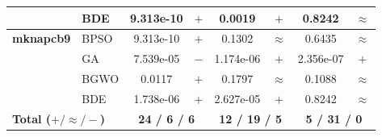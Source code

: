 \begin{table}[htbp]
\begin{tabular*}{\textwidth}{@{\extracolsep{\fill}}llcccccc@{}}
                       & BDE   & 9.313e-10 & $+$ &    0.0019 & $+$ &    0.8242 & $\approx$ \\
    \midrule
    \textbf{mknapcb9}  & BPSO  & 9.313e-10 & $+$ &    0.1302 & $\approx$ &    0.6435 & $\approx$ \\
                       & GA    & 7.539e-05 & $-$ & 1.174e-06 & $+$ & 2.356e-07 & $+$ \\
                       & BGWO  &    0.0117 & $+$ &    0.1797 & $\approx$ &    0.1088 & $\approx$ \\
                       & BDE   & 1.738e-06 & $+$ & 2.627e-05 & $+$ &    0.8242 & $\approx$ \\
    \midrule
    \multicolumn{2}{l}{\textbf{Total ($+ / \approx / -$)}} & \multicolumn{2}{c}{\textbf{24 / 6 / 6}}  & \multicolumn{2}{c}{\textbf{12 / 19 / 5}}  & \multicolumn{2}{c}{\textbf{5 / 31 / 0}} \\
    \bottomrule
  \end{tabular*}
  \vspace{1ex}
\end{table}
